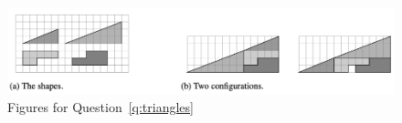 \documentclass[11pt, oneside]{article}   	%
\begin{document}
\begin{enumerate}
 
 \begin{figure}[h!]
\begin{center}
\includegraphics[width=\columnwidth]{DS2-HW2-triangles}
\caption{Figures for Question~\ref{q:triangles}}
\label{fig:triangles}
\end{center}
\end{figure}




\end{enumerate}
\end{document}
